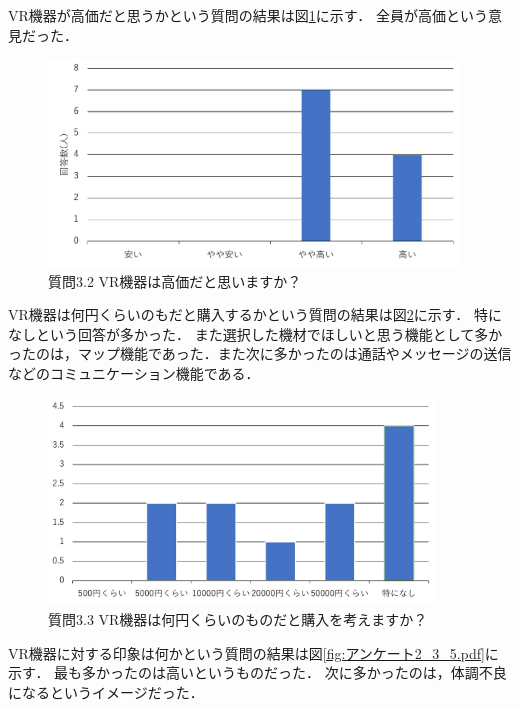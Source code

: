 \documentclass[12pt,a4j]{ltjsarticle}
\begin{document}
VR機器が高価だと思うかという質問の結果は図\ref{fig:アンケート2_3_2.pdf}に示す．
全員が高価という意見だった．

\begin{figure}[h]
\begin{center}
 \includegraphics[clip,height=55mm]{
 アンケート2_3_2.pdf}
\end{center}
 \caption{質問3.2 VR機器は高価だと思いますか？}
 \label{fig:アンケート2_3_2.pdf}
\end{figure}

VR機器は何円くらいのもだと購入するかという質問の結果は図\ref{fig:アンケート2_3_3.pdf}に示す．
特になしという回答が多かった．
また選択した機材でほしいと思う機能として多かったのは，マップ機能であった．また次に多かったのは通話やメッセージの送信などのコミュニケーション機能である．

\begin{figure}[h]
\begin{center}
 \includegraphics[clip,height=55mm]{
 アンケート2_3_3.pdf}
\end{center}
 \caption{質問3.3 VR機器は何円くらいのものだと購入を考えますか？}
 \label{fig:アンケート2_3_3.pdf}
\end{figure}

VR機器に対する印象は何かという質問の結果は図\ref{fig:アンケート2_3_5.pdf}に示す．
最も多かったのは高いというものだった．
次に多かったのは，体調不良になるというイメージだった．
\end{document}
